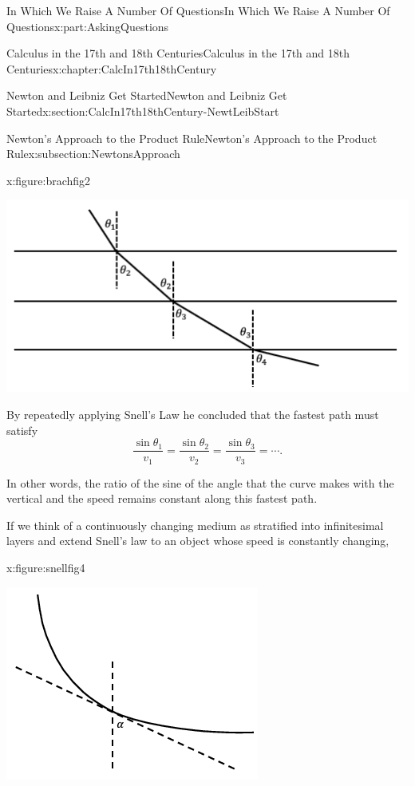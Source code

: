 \documentclass[oneside,10pt,]{book}
\numberwithin{equation}{section}
\begin{document}
\begin{partptx}{In Which We Raise A Number Of Questions}{}{In Which We Raise A Number Of Questions}{}{}{x:part:AskingQuestions}
\begin{chapterptx}{Calculus in the 17th and 18th Centuries}{}{Calculus in the 17th and 18th Centuries}{}{}{x:chapter:CalcIn17th18thCentury}
\begin{sectionptx}{Newton and Leibniz Get Started}{}{Newton and Leibniz Get Started}{}{}{x:section:CalcIn17th18thCentury-NewtLeibStart}
\begin{subsectionptx}{Newton's Approach to the Product Rule}{}{Newton's Approach to the Product Rule}{}{}{x:subsection:NewtonsApproach}
\begin{figureptx}{}{x:figure:brachfig2}{}
\begin{image}{0.125}{0.75}{0.125}
\includegraphics[width=\linewidth]{images/brachfig2.png}
\end{image}%
\tcblower
\end{figureptx}%
By repeatedly applying Snell's Law he concluded that the fastest path must satisfy%
\begin{equation*}
\frac{\sin \theta_1}{v_1}=\frac{\sin \theta_2}{v_2}=\frac{\sin\theta_3}{v_3}=\cdots\text{.}
\end{equation*}
%
\par
In other words, the ratio of the sine of the angle that the curve makes with the vertical and the speed remains constant along this fastest path.%
\par
If we think of a continuously changing medium as stratified into infinitesimal layers and extend Snell's law to an object whose speed is constantly changing,%
\begin{figureptx}{}{x:figure:snellfig4}{}%
\begin{image}{0.125}{0.75}{0.125}%
\includegraphics[width=\linewidth]{images/snellfig4.png}

\end{image}
\end{figureptx}
\end{subsectionptx}
\end{sectionptx}
\end{chapterptx}
\end{partptx}
\end{document}
